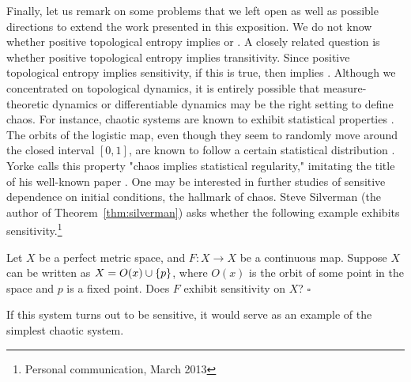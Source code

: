 \documentclass[10pt,twoside,draft]{book}
\begin{document}
Finally, let us remark on some problems that we left open as well as possible directions to extend the work presented in this exposition.
We do not know whether positive topological entropy implies \wig or \blcp.
A closely related question is whether positive topological entropy implies transitivity. 
Since positive topological entropy implies sensitivity, if this is true, then \akm implies \wig.
Although we concentrated on topological dynamics, it is entirely possible that measure-theoretic dynamics or differentiable dynamics \citep{smale} may be the right setting to define chaos.
For instance, chaotic systems are known to exhibit statistical properties \citep{lasota}.
The orbits of the logistic map, even though they seem to randomly move around the closed interval $[0,1]$, are known to follow a certain statistical distribution \citep{sternberg}.
Yorke calls this property "chaos implies statistical regularity," imitating the title of his well-known paper \citep{ueda-abraham}.
One may be interested in further studies of sensitive dependence on initial conditions, the hallmark of chaos.
Steve Silverman (the author of Theorem~\ref{thm:silverman}) asks whether the following example exhibits sensitivity.\footnote{Personal communication, March 2013}
\begin{example}
  Let $X$ be a perfect metric space, and $F: X \to X$ be a continuous map.
  Suppose $X$ can be written as $X = O(x) \cup \left \{ p \right \}$, where $O(x)$ is the orbit of some point in the space and $p$ is a fixed point.
  Does $F$ exhibit sensitivity on $X$?
  $\square$
\end{example}
If this system turns out to be sensitive, it would serve as an example of the simplest chaotic system.



\end{document}
